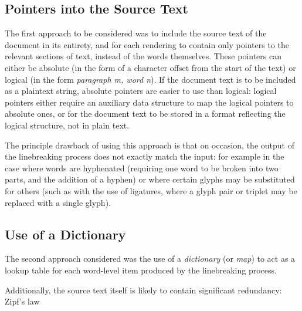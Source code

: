\subsection{Pointers into the Source Text}
The first approach to be considered was to include the source text of the document in its entirety, and for each rendering to contain only pointers to the relevant sections of text, instead of the words themselves. These pointers can either be absolute (in the form of a character offset from the start of the text) or logical (in the form \emph{paragraph m, word n}). If the document text is to be included as a plaintext string, absolute pointers are easier to use than logical: logical pointers either require an auxiliary data structure to map the logical pointers to absolute ones, or for the document text to be stored in a format reflecting the logical structure, \ie{} not in plain text.

The principle drawback of using this approach is that on occasion, the output of the linebreaking process does not exactly match the input: for example in the case where words are hyphenated (requiring one word to be broken into two parts, and the addition of a hyphen) or where certain glyphs may be substituted for others (such as with the use of ligatures, where a glyph pair or triplet may be replaced with a single glyph).




\subsection{Use of a Dictionary}
The second approach considered was the use of a \emph{dictionary} (or \emph{map}) to act as a lookup table for each word-level item produced by the linebreaking process.

Additionally, the source text itself is likely to contain significant redundancy: Zipf's law \cite{zipf1932}

